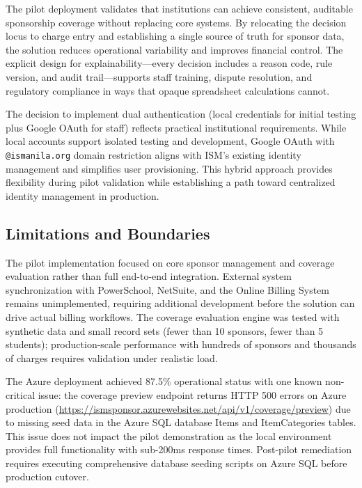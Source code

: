 The pilot deployment validates that institutions can achieve consistent, auditable sponsorship coverage without replacing core systems. By relocating the decision locus to charge entry and establishing a single source of truth for sponsor data, the solution reduces operational variability and improves financial control. The explicit design for explainability—every decision includes a reason code, rule version, and audit trail—supports staff training, dispute resolution, and regulatory compliance in ways that opaque spreadsheet calculations cannot.

The decision to implement dual authentication (local credentials for initial testing plus Google OAuth for staff) reflects practical institutional requirements. While local accounts support isolated testing and development, Google OAuth with \texttt{@ismanila.org} domain restriction aligns with ISM's existing identity management and simplifies user provisioning. This hybrid approach provides flexibility during pilot validation while establishing a path toward centralized identity management in production.

\subsection{Limitations and Boundaries}

The pilot implementation focused on core sponsor management and coverage evaluation rather than full end-to-end integration. External system synchronization with PowerSchool, NetSuite, and the Online Billing System remains unimplemented, requiring additional development before the solution can drive actual billing workflows. The coverage evaluation engine was tested with synthetic data and small record sets (fewer than 10 sponsors, fewer than 5 students); production-scale performance with hundreds of sponsors and thousands of charges requires validation under realistic load.

The Azure deployment achieved 87.5\% operational status with one known non-critical issue: the coverage preview endpoint returns HTTP 500 errors on Azure production (\url{https://ismsponsor.azurewebsites.net/api/v1/coverage/preview}) due to missing seed data in the Azure SQL database Items and ItemCategories tables. This issue does not impact the pilot demonstration as the local environment provides full functionality with sub-200ms response times. Post-pilot remediation requires executing comprehensive database seeding scripts on Azure SQL before production cutover.

